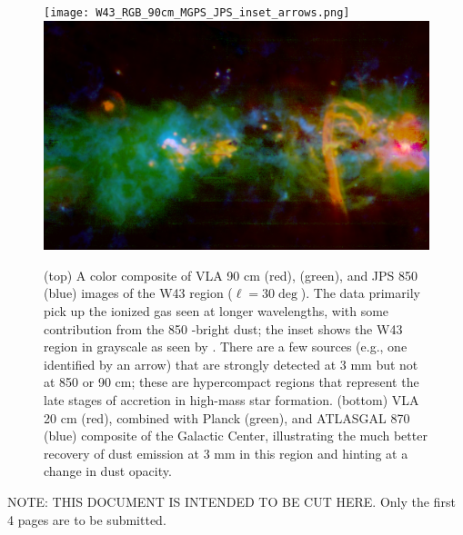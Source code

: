 \documentclass[11pt,preprint]{aastex_nofoot}
\begin{document}
\begin{figure}
\texttt{[image: W43\_RGB\_90cm\_MGPS\_JPS\_inset\_arrows.png]}
\includegraphics[width=16cm]{SgrB2_RGB_20cm_MGPSplanck_ATLASGAL.png}
\caption{
(top) A color composite of VLA 90 cm (red), \MGPS (green), and JPS 850 \um (blue)
images of the W43 region ($\ell=30\deg$).  The \MGPS data primarily pick up
the ionized gas seen at longer wavelengths, with some contribution from the 
850 \um-bright dust; the inset shows the W43 region in grayscale as seen by
\MGPS.  There are a few sources (e.g., one identified by an arrow) that are strongly detected at 3 mm but not
at 850 \um or 90 cm; these are hypercompact \hii regions that represent
the late stages of accretion in high-mass star formation.
(bottom) VLA 20 cm (red), \MGPS combined with Planck (green), and ATLASGAL
870 \um (blue) composite of the Galactic Center, illustrating the much better
recovery of dust emission at 3 mm in this region and hinting at a change in
dust opacity.
}
\label{fig:figure}
\end{figure}

\clearpage

NOTE: THIS DOCUMENT IS INTENDED TO BE CUT HERE.  Only the first 4 pages are to be submitted.


% 
% 
% 
\end{document}
